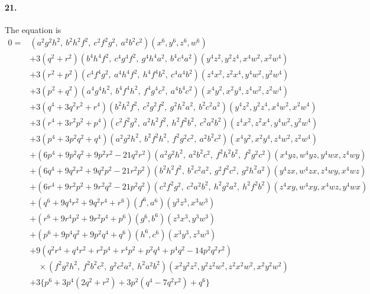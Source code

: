 \documentclass[11pt,a4paper]{article}
\begin{document}
\paragraph{21.}
The equation is
\[
\begin{aligned}
0 = {}& (a^2 g^2 h^2,\ b^2 h^2 f^2,\ c^2 f^2 g^2,\ a^2 b^2 c^2)(x^6, y^6, z^6, w^6) \\
& + 3 (q^2 + r^2)(b^4 h^4 f^2,\ c^4 g^4 f^2,\ g^4 h^4 a^2,\ b^4 c^4 a^2)(y^4 z^2, y^2 z^4, x^4 w^2, x^2 w^4) \\
& + 3 (r^2 + p^2)(c^4 f^4 g^2,\ a^4 h^4 f^2,\ h^4 f^4 b^2,\ c^4 a^4 b^2)(z^4 x^2, z^2 x^4, y^4 w^2, y^2 w^4) \\
& + 3 (p^2 + q^2)(a^4 g^4 h^2,\ b^4 f^4 h^2,\ f^4 g^4 c^2,\ a^4 b^4 c^2)(x^4 y^2, x^2 y^4, z^4 w^2, z^2 w^4) \\[2pt]
& + 3 (q^4 + 3 q^2 r^2 + r^4)(b^2 h^2 f^2,\ c^2 g^2 f^2,\ g^2 h^2 a^2,\ b^2 c^2 a^2)(y^4 z^2, y^2 z^4, x^4 w^2, x^2 w^4) \\
& + 3 (r^4 + 3 r^2 p^2 + p^4)(c^2 f^2 g^2,\ a^2 h^2 f^2,\ h^2 f^2 b^2,\ c^2 a^2 b^2)(z^4 x^2, z^2 x^4, y^4 w^2, y^2 w^4) \\
& + 3 (p^4 + 3 p^2 q^2 + q^4)(a^2 g^2 h^2,\ b^2 f^2 h^2,\ f^2 g^2 c^2,\ a^2 b^2 c^2)(x^4 y^2, x^2 y^4, z^4 w^2, z^2 w^4) \\[2pt]
& + (6 p^4 + 9 p^2 q^2 + 9 p^2 r^2 - 21 q^2 r^2)(a^2 g^2 h^2,\ a^2 b^2 c^2,\ f^2 h^2 b^2,\ f^2 g^2 c^2)(x^4 yz, w^4 yz, y^4 wx, z^4 wy) \\
& + (6 q^4 + 9 q^2 r^2 + 9 q^2 p^2 - 21 r^2 p^2)(b^2 h^2 f^2,\ b^2 c^2 a^2,\ g^2 f^2 c^2,\ g^2 h^2 a^2)(y^4 zx, w^4 zx, z^4 wy, x^4 wz) \\
& + (6 r^4 + 9 r^2 p^2 + 9 r^2 q^2 - 21 p^2 q^2)(c^2 f^2 g^2,\ c^2 a^2 b^2,\ h^2 g^2 a^2,\ h^2 f^2 b^2)(z^4 xy, w^4 xy, x^4 wz, y^4 wx) \\[2pt]
& + (q^6 + 9 q^4 r^2 + 9 q^2 r^4 + r^6)(f^6, a^6)(y^3 z^3, x^3 w^3) \\
& + (r^6 + 9 r^4 p^2 + 9 r^2 p^4 + p^6)(g^6, b^6)(z^3 x^3, y^3 w^3) \\
& + (p^6 + 9 p^4 q^2 + 9 p^2 q^4 + q^6)(h^6, c^6)(x^3 y^3, z^3 w^3) \\[2pt]
& + 9 (q^2 r^4 + q^4 r^2 + r^2 p^4 + r^4 p^2 + p^2 q^4 + p^4 q^2 - 14 p^2 q^2 r^2) \\
& \quad \times (f^2 g^2 h^2,\ f^2 b^2 c^2,\ g^2 c^2 a^2,\ h^2 a^2 b^2)(x^2 y^2 z^2, y^2 z^2 w^2, z^2 x^2 w^2, x^2 y^2 w^2) \\[2pt]
& + 3 \bigl\{ p^6 + 3 p^4 (2 q^2 + r^2) + 3 p^2 (q^4 - 7 q^2 r^2) + q^6 \bigr\} \\

\end{aligned}\]
\end{document}
